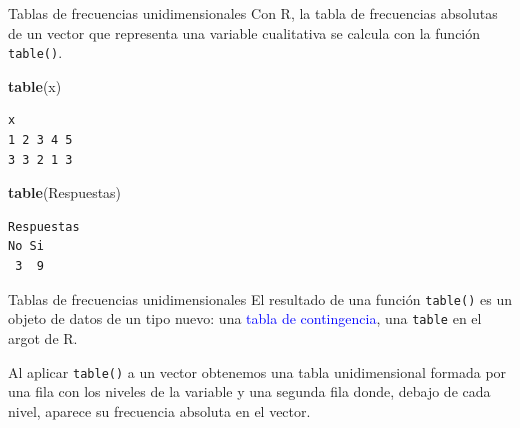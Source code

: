 \documentclass[
  ignorenonframetext,
]{beamer}
\newenvironment{Shaded}{\begin{snugshade}}{\end{snugshade}}
\newcommand{\FunctionTok}[1]{\textcolor[rgb]{0.13,0.29,0.53}{\textbf{#1}}}
\newcommand{\NormalTok}[1]{#1}
\newcommand\blue[1]{\textcolor{blue}{#1}}
\begin{document}
\begin{frame}[fragile]{Tablas de frecuencias unidimensionales}
\label{tablas-de-frecuencias-unidimensionales-1}
Con R, la tabla de frecuencias absolutas de un vector que representa una
variable cualitativa se calcula con la función \texttt{table()}.

\begin{Shaded}
\begin{Highlighting}[]
\FunctionTok{table}\NormalTok{(x)}
\end{Highlighting}
\end{Shaded}

\begin{verbatim}
x
1 2 3 4 5 
3 3 2 1 3 
\end{verbatim}

\begin{Shaded}
\begin{Highlighting}[]
\FunctionTok{table}\NormalTok{(Respuestas)}
\end{Highlighting}
\end{Shaded}

\begin{verbatim}
Respuestas
No Si 
 3  9 
\end{verbatim}
\end{frame}

\begin{frame}[fragile]{Tablas de frecuencias unidimensionales}
\label{tablas-de-frecuencias-unidimensionales-2}
El resultado de una función \texttt{table()} es un objeto de datos de un
tipo nuevo: una \blue{tabla de contingencia}, una \texttt{table} en el
argot de R.

Al aplicar \texttt{table()} a un vector obtenemos una tabla
unidimensional formada por una fila con los niveles de la variable y una
segunda fila donde, debajo de cada nivel, aparece su frecuencia absoluta
en el vector.
\end{frame}
\end{document}
